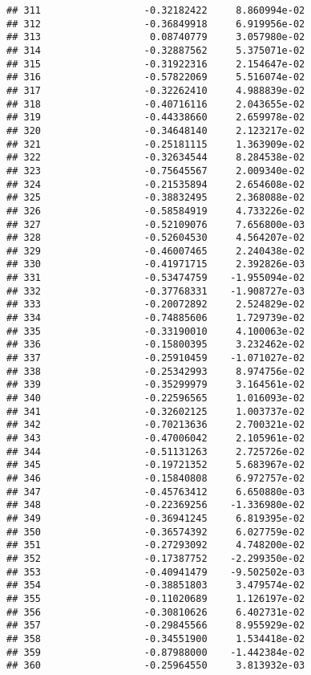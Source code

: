 \documentclass[
]{article}
\begin{document}
\begin{verbatim}
## 311                  -0.32182422     8.860994e-02
## 312                  -0.36849918     6.919956e-02
## 313                   0.08740779     3.057980e-02
## 314                  -0.32887562     5.375071e-02
## 315                  -0.31922316     2.154647e-02
## 316                  -0.57822069     5.516074e-02
## 317                  -0.32262410     4.988839e-02
## 318                  -0.40716116     2.043655e-02
## 319                  -0.44338660     2.659978e-02
## 320                  -0.34648140     2.123217e-02
## 321                  -0.25181115     1.363909e-02
## 322                  -0.32634544     8.284538e-02
## 323                  -0.75645567     2.009340e-02
## 324                  -0.21535894     2.654608e-02
## 325                  -0.38832495     2.368088e-02
## 326                  -0.58584919     4.733226e-02
## 327                  -0.52109076     7.656800e-03
## 328                  -0.52604530     4.564207e-02
## 329                  -0.46007465     2.240438e-02
## 330                  -0.41971715     2.392826e-03
## 331                  -0.53474759    -1.955094e-02
## 332                  -0.37768331    -1.908727e-03
## 333                  -0.20072892     2.524829e-02
## 334                  -0.74885606     1.729739e-02
## 335                  -0.33190010     4.100063e-02
## 336                  -0.15800395     3.232462e-02
## 337                  -0.25910459    -1.071027e-02
## 338                  -0.25342993     8.974756e-02
## 339                  -0.35299979     3.164561e-02
## 340                  -0.22596565     1.016093e-02
## 341                  -0.32602125     1.003737e-02
## 342                  -0.70213636     2.700321e-02
## 343                  -0.47006042     2.105961e-02
## 344                  -0.51131263     2.725726e-02
## 345                  -0.19721352     5.683967e-02
## 346                  -0.15840808     6.972757e-02
## 347                  -0.45763412     6.650880e-03
## 348                  -0.22369256    -1.336980e-02
## 349                  -0.36941245     6.819395e-02
## 350                  -0.36574392     6.027759e-02
## 351                  -0.27293092     4.748200e-02
## 352                  -0.17387752    -2.299350e-02
## 353                  -0.40941479    -9.502502e-03
## 354                  -0.38851803     3.479574e-02
## 355                  -0.11020689     1.126197e-02
## 356                  -0.30810626     6.402731e-02
## 357                  -0.29845566     8.955929e-02
## 358                  -0.34551900     1.534418e-02
## 359                  -0.87988000    -1.442384e-02
## 360                  -0.25964550     3.813932e-03

\end{verbatim}
\end{document}
